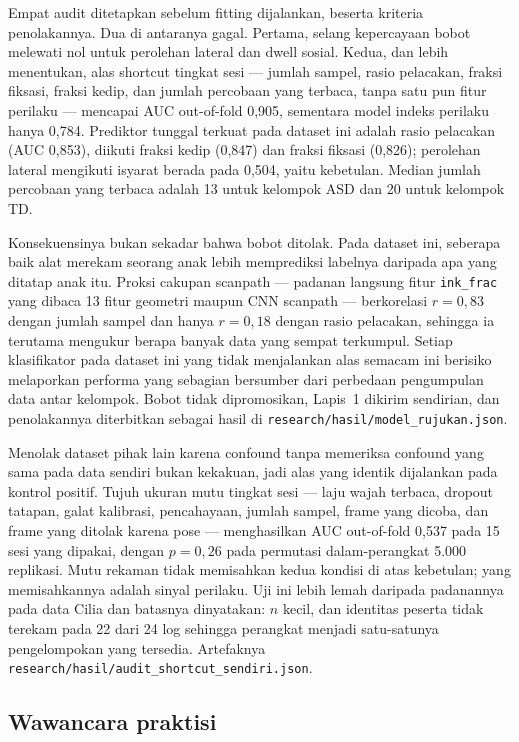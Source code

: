\documentclass{article}
\begin{document}
Empat audit ditetapkan sebelum fitting dijalankan, beserta kriteria penolakannya. Dua di
antaranya gagal. Pertama, selang kepercayaan bobot melewati nol untuk perolehan lateral dan
dwell sosial. Kedua, dan lebih menentukan, alas shortcut tingkat sesi --- jumlah sampel,
rasio pelacakan, fraksi fiksasi, fraksi kedip, dan jumlah percobaan yang terbaca, tanpa satu
pun fitur perilaku --- mencapai AUC out-of-fold 0,905, sementara model indeks perilaku hanya
0,784. Prediktor tunggal terkuat pada dataset ini adalah rasio pelacakan (AUC 0,853), diikuti
fraksi kedip (0,847) dan fraksi fiksasi (0,826); perolehan lateral mengikuti isyarat berada
pada 0,504, yaitu kebetulan. Median jumlah percobaan yang terbaca adalah 13 untuk kelompok
ASD dan 20 untuk kelompok TD.

Konsekuensinya bukan sekadar bahwa bobot ditolak. Pada dataset ini, seberapa baik alat
merekam seorang anak lebih memprediksi labelnya daripada apa yang ditatap anak itu. Proksi
cakupan scanpath --- padanan langsung fitur \texttt{ink\_frac} yang dibaca 13 fitur geometri
maupun CNN scanpath --- berkorelasi $r = 0{,}83$ dengan jumlah sampel dan hanya $r = 0{,}18$
dengan rasio pelacakan, sehingga ia terutama mengukur berapa banyak data yang sempat
terkumpul. Setiap klasifikator pada dataset ini yang tidak menjalankan alas semacam ini
berisiko melaporkan performa yang sebagian bersumber dari perbedaan pengumpulan data antar
kelompok. Bobot tidak dipromosikan, Lapis~1 dikirim sendirian, dan penolakannya diterbitkan
sebagai hasil di \texttt{research/hasil/model\_rujukan.json}.

Menolak dataset pihak lain karena confound tanpa memeriksa confound yang sama pada data
sendiri bukan kekakuan, jadi alas yang identik dijalankan pada kontrol positif. Tujuh
ukuran mutu tingkat sesi --- laju wajah terbaca, dropout tatapan, galat kalibrasi,
pencahayaan, jumlah sampel, frame yang dicoba, dan frame yang ditolak karena pose ---
menghasilkan AUC out-of-fold 0,537 pada 15 sesi yang dipakai, dengan $p = 0{,}26$ pada
permutasi dalam-perangkat 5.000 replikasi. Mutu rekaman tidak memisahkan kedua kondisi di
atas kebetulan; yang memisahkannya adalah sinyal perilaku. Uji ini lebih lemah daripada
padanannya pada data Cilia dan batasnya dinyatakan: $n$ kecil, dan identitas peserta tidak
terekam pada 22 dari 24 log sehingga perangkat menjadi satu-satunya pengelompokan yang
tersedia. Artefaknya \texttt{research/hasil/audit\_shortcut\_sendiri.json}.

\subsection{Wawancara praktisi}
\end{document}
